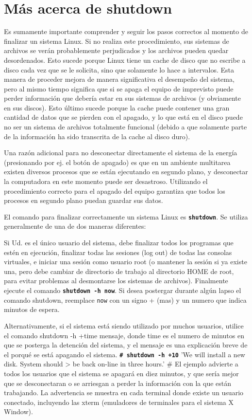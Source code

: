 \documentclass[12pt]{article}
\begin{document}
\section{ Más acerca de shutdown}

 Es sumamente importante comprender y seguir los pasos correctos al
momento de finalizar un sistema Linux. Si no realiza este procedimiento, sus
sistemas de archivos se verán probablemente perjudicados y los archivos pueden
quedar desordenados. Esto sucede porque Linux tiene un cache de disco que no
escribe a disco cada vez que se le solicita, sino que solamente lo hace a
intervalos. Esta manera de proceder mejora de manera significativa el desempeño
del sistema, pero al mismo tiempo significa que si se apaga el equipo de
imprevisto puede perder información que debería estar en sus sistemas de
archivos (y obviamente en sus discos). Esto último sucede porque la cache puede
contener una gran cantidad de datos que se pierden con el apagado, y lo que está
en el disco puede no ser un sistema de archivos totalmente funcional (debido a
que solamente parte de la información ha sido transcrita de la cache al disco
duro).  

 Una razón adicional para no desconectar directamente el sistema de la
energía (presionando por ej. el botón de apagado) es que en un ambiente
multitarea existen diversos procesos que se están ejecutando en segundo plano, y
desconectar la computadora en este momento puede ser desastroso. Utilizando el
procedimiento correcto para el apagado del equipo garantiza que todos los
procesos en segundo plano puedan guardar sus datos.  

 El comando para finalizar correctamente un sistema Linux es
\texttt{\textbf{shutdown}}. Se utiliza generalmente de una de dos maneras
diferentes: 

 Si Ud. es el único usuario del sistema, debe finalizar todos los
programas que estén en ejecución, finalizar todas las sesiones (log out) de
todas las consolas virtuales, e iniciar una sesión como usuario root (o mantener
la sesión si ya existe una, pero debe cambiar de directorio de trabajo al
directorio HOME de root, para evitar problemas al desmontarse los sistemas de
archivos). Finalmente ejecute el comando \texttt{\textbf{shutdown -h now}}. Si
desea postergar durante algún lapso el comando shutdown, reemplace
\texttt{now} con un signo + (mas) y un numero que indica minutos de
espera.  

 Alternativamente, si el sistema está siendo utilizado por muchos
usuarios, utilice el comando shutdown -h +time mensaje, donde time es el numero
de minutos en que se posterga la detención del sistema, y el mensaje es una
explicación breve de el porqué se está apagando el sistema.
\texttt{\textbf{\# shutdown -h +10}} 'We will install a new 
disk.  System should
> be back on-line in three hours.'
\#
El ejemplo advierte a todos los usuarios que el sistema se apagará en diez
minutos, y que sería mejor que se desconectaran o se arriesgan a perder la
información con la que están trabajando. La advertencia se muestra en cada
terminal donde existe un usuario conectado, incluyendo las xterm (emuladores de
terminales para el sistema X Window).
\end{document}
